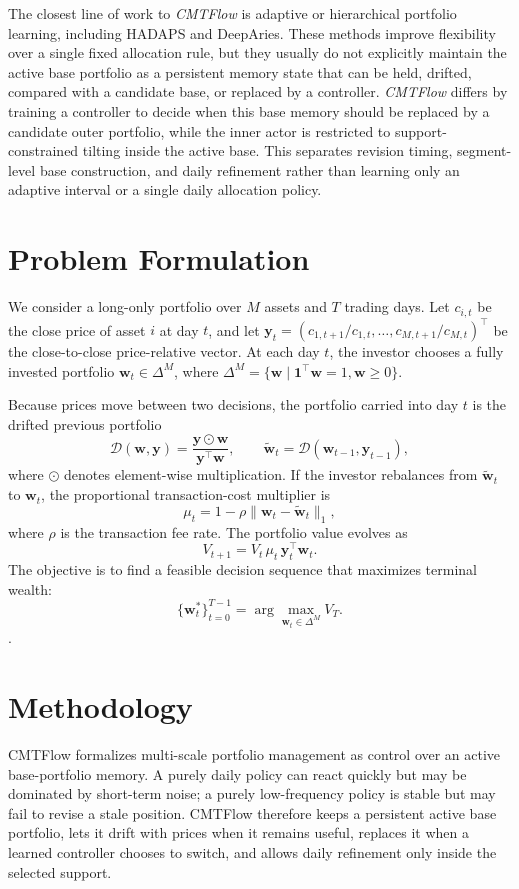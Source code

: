 \documentclass[letterpaper]{article} %
\begin{document}
The closest line of work to \textit{CMTFlow} is adaptive or hierarchical portfolio learning, including HADAPS and DeepAries. These methods improve flexibility over a single fixed allocation rule, but they usually do not explicitly maintain the active base portfolio as a persistent memory state that can be held, drifted, compared with a candidate base, or replaced by a controller. \textit{CMTFlow} differs by training a controller to decide when this base memory should be replaced by a candidate outer portfolio, while the inner actor is restricted to support-constrained tilting inside the active base. This separates revision timing, segment-level base construction, and daily refinement rather than learning only an adaptive interval or a single daily allocation policy.

\section{Problem Formulation}
We consider a long-only portfolio over \(M\) assets and \(T\) trading days. Let \(c_{i,t}\) be the close price of asset \(i\) at day \(t\), and let \(\mathbf{y}_t=(c_{1,t+1}/c_{1,t},\ldots,c_{M,t+1}/c_{M,t})^\top\) be the close-to-close price-relative vector. At each day \(t\), the investor chooses a fully invested portfolio \(\mathbf{w}_t\in\Delta^M\), where \(\Delta^M=\{\mathbf{w}\mid \mathbf{1}^\top\mathbf{w}=1,\mathbf{w}\ge0\}\).

Because prices move between two decisions, the portfolio carried into day \(t\) is the drifted previous portfolio
\[
\mathcal{D}(\mathbf{w},\mathbf{y})
=
\frac{\mathbf{y}\odot \mathbf{w}}{\mathbf{y}^\top \mathbf{w}},
\qquad
\tilde{\mathbf{w}}_t=\mathcal{D}(\mathbf{w}_{t-1},\mathbf{y}_{t-1}),
\]
where \(\odot\) denotes element-wise multiplication. If the investor rebalances from \(\tilde{\mathbf{w}}_t\) to \(\mathbf{w}_t\), the proportional transaction-cost multiplier is
\[
\mu_t
=
1-\rho\|\mathbf{w}_t-\tilde{\mathbf{w}}_t\|_1,
\]
where \(\rho\) is the transaction fee rate. The portfolio value evolves as
\[
V_{t+1} = V_t\,\mu_t\, \mathbf{y}_t^\top \mathbf{w}_t.
\]
The objective is to find a feasible decision sequence that maximizes terminal wealth:
\[
\{\mathbf{w}_t^*\}_{t=0}^{T-1}
= \arg\max_{\mathbf{w}_t\in\Delta^M} V_T .
\].

\section{Methodology}
CMTFlow formalizes multi-scale portfolio management as control over an active base-portfolio memory. A purely daily policy can react quickly but may be dominated by short-term noise; a purely low-frequency policy is stable but may fail to revise a stale position. CMTFlow therefore keeps a persistent active base portfolio, lets it drift with prices when it remains useful, replaces it when a learned controller chooses to switch, and allows daily refinement only inside the selected support.
\end{document}
